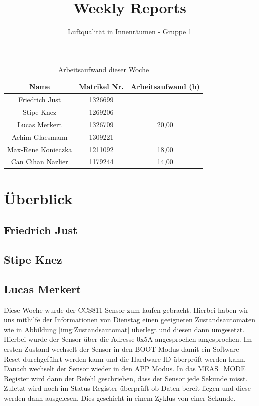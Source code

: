 \documentclass[]{article}
\title{Weekly Reports}
\author{Luftqualität in Innenräumen - Gruppe 1}
\begin{document}
\maketitle

\begin{table}[h!]
	\centering
	\begin{tabular}{|c|c|c|}
		\hline
		{\textbf{Name}}				&		{\textbf{Matrikel Nr.}} & {\textbf{Arbeitsaufwand (h)}} \\
		\hline
		Friedrich Just				&		1326699 				&		\\
		\hline
		Stipe Knez				&		1269206 				&	\\
		\hline
		Lucas Merkert				&		1326709					&	20,00	\\
		\hline
		Achim Glaesmann				&		1309221					&		\\
		\hline
		Max-Rene Konieczka			&		1211092					&	18,00	\\
		\hline
		Can Cihan Nazlier			&		1179244					&	14,00	\\
		\hline
	\end{tabular}
	\caption{Arbeitsaufwand dieser Woche}
	\label{tab:worakload}
\end{table}



\section{Überblick}


\subsection{Friedrich Just}



\subsection{Stipe Knez}

\subsection{Lucas Merkert}
Diese Woche wurde der CCS811 Sensor zum laufen gebracht. Hierbei haben wir uns mithilfe der Informationen von Dienstag einen geeigneten Zustandsautomaten wie in Abbildung \ref{img:Zustandsautomat} überlegt und diesen dann umgesetzt. Hierbei wurde der Sensor über die Adresse 0x5A angesprochen angesprochen. Im ersten Zustand wechselt der Sensor in den BOOT Modus damit ein Software-Reset durchgeführt werden kann und die Hardware ID überprüft werden kann. Danach wechselt der Sensor wieder in den APP Modus. In das MEAS\_MODE Register wird dann der Befehl geschrieben, dass der Sensor jede Sekunde misst. Zuletzt wird noch im Status Register überprüft ob Daten bereit liegen und diese werden dann ausgelesen. Dies geschieht in einem Zyklus von einer Sekunde.
\end{document}
